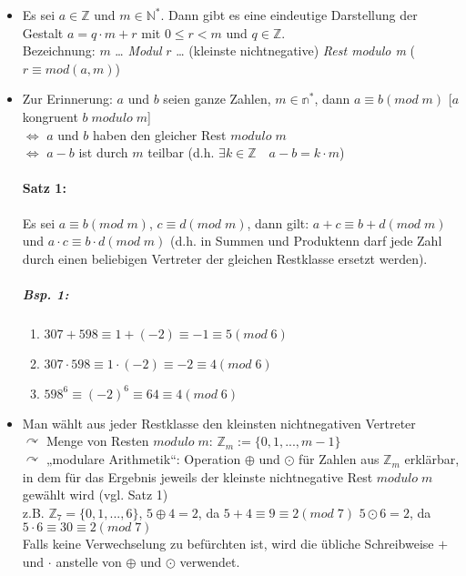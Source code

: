 \begin{itemize}
\item Es sei $a \in \mathbb{Z}$ und $m\in\mathbb{N}^*$. Dann gibt es eine eindeutige Darstellung der Gestalt $\boxed{a=q\cdot m + r}$ mit $\boxed{0\leq r < m}$ und $q \in \mathbb{Z}$.\\
Bezeichnung: $m$ … \emph{Modul} \qquad $r$ … (kleinste nichtnegative) \emph{Rest modulo m} ($r \equiv mod (a,m)$)
\item Zur Erinnerung: $a$ und $b$ seien ganze Zahlen, $m\in \mathbb{n}^*$, dann $a\equiv b (mod\; m)$ [$a$ kongruent $b\; modulo\; m$]\\
$\Leftrightarrow$ $a$ und $b$ haben den gleicher Rest $modulo\; m$\\
$\Leftrightarrow$ $a-b$ ist durch $m$ teilbar (d.h. $\exists k \in \mathbb{Z} \quad a-b = k\cdot m$)
\paragraph{Satz 1:} \parskp
Es sei $a \equiv b (mod\; m)$, $c\equiv d (mod\; m)$, dann gilt: $a+c \equiv b+d (mod \;m)$ und $a\cdot c \equiv b \cdot d (mod\; m)$ (d.h. in Summen und Produktenn darf jede Zahl durch einen beliebigen Vertreter der gleichen Restklasse ersetzt werden).
\subparagraph{Bsp. 1:} 
\begin{enumerate}[label=\alph*)]
\item $307+598 \equiv 1+(-2)\equiv -1 \equiv 5 (mod \; 6)$
\item $307\cdot 598 \equiv 1 \cdot (-2) \equiv -2 \equiv 4 (mod \; 6)$
\item $598^6 \equiv (-2)^6\equiv 64 \equiv 4 (mod \; 6)$
\end{enumerate}
\item Man wählt aus jeder Restklasse den kleinsten nichtnegativen Vertreter \\
$\curvearrowright$ Menge von Resten $modulo \; m$: $\mathbb{Z}_m:= \{0,1,...,m-1\}$ \\
$\curvearrowright$ „modulare Arithmetik“: Operation $\oplus$ und $\odot$ für Zahlen aus $\mathbb{Z}_m$ erklärbar, in dem für das Ergebnis jeweils der kleinste nichtnegative Rest $modulo \; m$ gewählt wird (vgl. Satz 1)\\
z.B. $\mathbb{Z}_7 = \{ 0,1,..., 6\}$, \quad $5\oplus 4=2$, da $5+4\equiv 9\equiv 2 (mod \; 7)$ \quad $5\odot 6=2$, da $5\cdot 6\equiv 30 \equiv 2 (mod \;7)$\smallskip\\
Falls keine Verwechselung zu befürchten ist, wird die übliche Schreibweise $+$ und $\cdot$ anstelle von $\oplus$ und $\odot$ verwendet.
\end{itemize}

